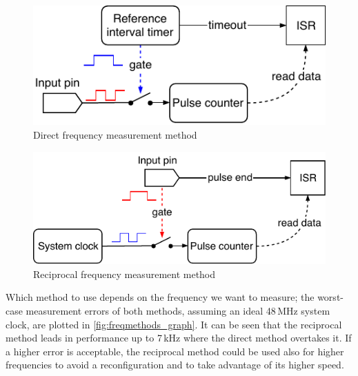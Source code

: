 \begin{figure}[h]
	\centering
	\includegraphics[scale=1] {img/fcap-direct.pdf}
	\caption{\label{fig:fcap_direct_dia}Direct frequency measurement method}
\end{figure}

\begin{figure}[h]
\centering
\includegraphics[scale=1] {img/fcap-reciprocal.pdf}
\caption{\label{fig:fcap_reci_dia}Reciprocal frequency measurement method}
\end{figure}

Which method to use depends on the frequency we want to measure; the worst-case measurement errors of both methods, assuming an ideal 48\,MHz system clock, are plotted in \cref{fig:freqmethods_graph}. It can be seen that the reciprocal method leads in performance up to 7\,kHz where the direct method overtakes it. If a higher error is acceptable, the reciprocal method could be used also for higher frequencies to avoid a reconfiguration and to take advantage of its higher speed.

